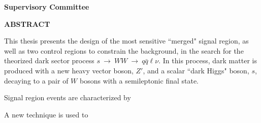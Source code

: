 \newpage
{}

\noindent \textbf{Supervisory Committee}
\tpbreak
\panel

\begin{center}
\textbf{ABSTRACT}
\end{center}

This thesis presents the design of the most sensitive ``merged" signal region, as well as two control regions to constrain the \ttbar background, in the search for the theorized dark sector process $s~\rightarrow~WW~\rightarrow~q\bar{q}\ell\nu$. In this process, dark matter is produced with a new heavy vector boson, $Z'$, and a scalar ``dark Higgs" boson, $s$, decaying to a pair of $W$ bosons with a semileptonic final state.

Signal region events are characterized by

A new technique is used to
